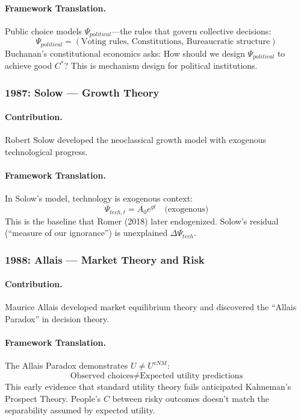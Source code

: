 \documentclass[12pt,a4paper]{article}
\begin{document}
\paragraph{Framework Translation.}
Public choice models $\Psi_{political}$---the rules that govern collective decisions:
\begin{equation}
  \Psi_{political} = (\text{Voting rules, Constitutions, Bureaucratic structure})
\end{equation}
Buchanan's constitutional economics asks: How should we design $\Psi_{political}$
to achieve good $C^*$? This is mechanism design for political institutions.

\subsubsection{1987: Solow --- Growth Theory}

\paragraph{Contribution.}
Robert Solow developed the neoclassical growth model with exogenous
technological progress.

\paragraph{Framework Translation.}
In Solow's model, technology is exogenous context:
\begin{equation}
  \Psi_{tech,t} = A_0 e^{gt} \quad \text{(exogenous)}
\end{equation}
This is the baseline that Romer (2018) later endogenized.
Solow's residual (``measure of our ignorance'') is unexplained $\Delta \Psi_{tech}$.

\subsubsection{1988: Allais --- Market Theory and Risk}

\paragraph{Contribution.}
Maurice Allais developed market equilibrium theory and discovered
the ``Allais Paradox'' in decision theory.

\paragraph{Framework Translation.}
The Allais Paradox demonstrates $U \neq U^{vNM}$:
\begin{equation}
  \text{Observed choices} \neq \text{Expected utility predictions}
\end{equation}
This early evidence that standard utility theory fails anticipated
Kahneman's Prospect Theory. People's $C$ between risky outcomes
doesn't match the separability assumed by expected utility.
\end{document}
